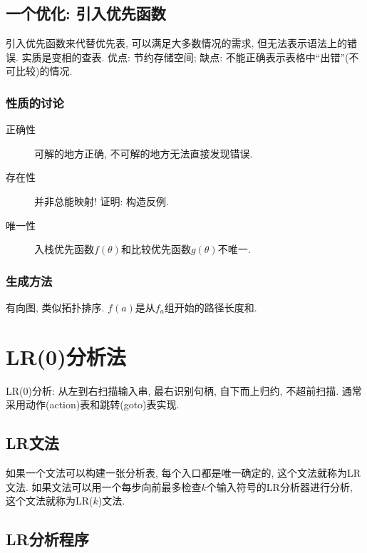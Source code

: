         \subsection{一个优化: 引入优先函数}

            引入优先函数来代替优先表, 可以满足大多数情况的需求, 但无法表示语法上的错误. 实质是变相的查表. 优点: 节约存储空间; 缺点: 不能正确表示表格中``出错''(不可比较)的情况.

            \subsubsection{性质的讨论} 
            
                \begin{description}
                    \item[正确性] 可解的地方正确, 不可解的地方无法直接发现错误.
                    \item[存在性] 并非总能映射! 证明: 构造反例.
                    \item[唯一性] \textsf{入栈优先函数}$f(\theta)$和\textsf{比较优先函数}$g(\theta)$不唯一.
                \end{description}

            \subsubsection{生成方法} 有向图, 类似拓扑排序. $f(a)$是从$f_a$组开始的路径长度和.

    \section{LR(0)分析法}

        LR(0)分析: 从左到右扫描输入串, 最右识别句柄, 自下而上归约, 不超前扫描. 通常采用动作(action)表和跳转(goto)表实现. 

        \subsection{LR文法}

            如果一个文法可以构建一张分析表, 每个入口都是唯一确定的, 这个文法就称为\textsf{LR文法}. 如果文法可以用一个每步向前最多检查$k$个输入符号的LR分析器进行分析, 这个文法就称为\textsf{LR($k$)文法}.

        \subsection{LR分析程序}

